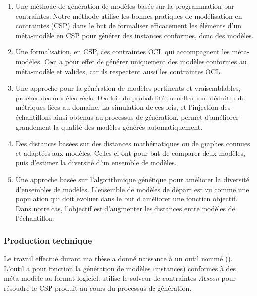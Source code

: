 \begin{enumerate}
\item Une méthode de génération de modèles basée sur la programmation par contraintes. Notre méthode utilise les bonnes pratiques de modélisation en contraintes (CSP) dans le but de formaliser efficacement les éléments d'un méta-modèle en CSP pour générer des instances conformes, donc des modèles.

\item Une formalisation, en CSP, des contraintes OCL qui accompagnent les méta-modèles. Ceci a pour effet de générer uniquement des modèles conformes au méta-modèle et valides, car ils respectent aussi les contraintes OCL.

\item Une approche pour la génération de modèles pertinents et vraisemblables, proches des modèles réels. Des lois de probabilités usuelles sont déduites de métriques liées au domaine. La simulation de ces lois, et l'injection des échantillons ainsi obtenus au processus de génération, permet d'améliorer grandement la qualité des modèles générés automatiquement.

\item Des distances basées sur des distances mathématiques ou de graphes connues et adaptées aux modèles. Celles-ci ont  pour but de comparer deux modèles, puis d'estimer la diversité d'un ensemble de modèles.

\item Une approche basée sur l'algorithmique génétique pour améliorer la diversité d'ensembles de modèles. L'ensemble de modèles de départ est vu comme une population qui doit évoluer dans le but d'améliorer une fonction objectif. Dans notre cas, l'objectif est d'augmenter les distances entre modèles de l'échantillon.   
\end{enumerate}


\subsubsection*{Production technique}

Le travail effectué durant ma thèse a donné naissance à un outil nommé \grimm(\grimmtext). L'outil a pour fonction la génération de modèles (instances) conformes à des méta-modèle au format logiciel. \grimm{} utilise le solveur de contraintes {\it Abscon} pour résoudre le CSP produit au cours du processus de génération.

